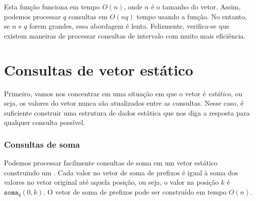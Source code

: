 Esta função funciona em tempo $O(n)$,
onde $n$ é o tamanho do vetor.
Assim, podemos processar $q$ consultas em $O(nq)$
tempo usando a função.
No entanto, se $n$ e $q$ forem grandes, essa abordagem
é lenta. Felizmente, verifica-se que existem
maneiras de processar consultas de intervalo com muito mais eficiência.

\section{Consultas de vetor estático}

Primeiro, vamos nos concentrar em uma situação em que
o vetor é \emph{estático}, ou seja,
os valores do vetor nunca são atualizados entre as consultas.
Nesse caso, é suficiente construir
uma estrutura de dados estática que nos diga
a resposta para qualquer consulta possível.

\subsubsection{Consultas de soma}


Podemos processar facilmente
consultas de soma em um vetor estático
construindo um .
Cada valor no vetor de soma de prefixos é igual
à soma dos valores no vetor original até aquela posição,
ou seja, o valor na posição $k$ é $\texttt{soma}_q(0,k)$.
O vetor de soma de prefixos pode ser construído em tempo $O(n)$.

